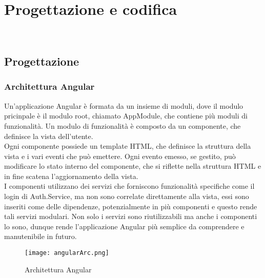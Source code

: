 
\chapter{Progettazione e codifica}
\label{cap:progettazione e codifica}

\\

\section{Progettazione}
\subsection{Architettura Angular}
Un'applicazione Angular è formata da un insieme di moduli, dove il modulo pricinpale è il modulo root, chiamato AppModule, che contiene più moduli di funzionalità. Un modulo di funzionalità è composto da un componente, che definisce la vista dell'utente.\\
Ogni componente possiede un template HTML, che definisce la struttura della vista e i vari eventi che può emettere. Ogni evento emesso, se gestito, può modificare lo stato interno del componente, che si riflette nella struttura HTML e in fine scatena l'aggiornamento della vista.\\
I componenti utilizzano dei servizi che forniscono funzionalità specifiche come il login di Auth.Service, ma non sono correlate direttamente alla vista, essi sono inseriti come delle dipendenze, potenzialmente in più componenti e questo rende tali servizi modulari. Non solo i servizi sono riutilizzabili ma anche i componenti lo sono, dunque rende l'applicazione Angular più semplice da comprendere e manutenibile in futuro.\\
\begin{figure}[H]
    \centering
    \texttt{[image: angularArc.png]}
    \caption{Architettura Angular}
\end{figure}
